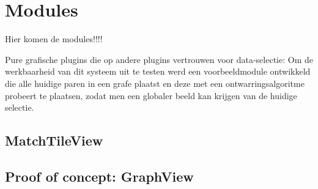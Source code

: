 \chapter{Modules}
\label{hoofdstuk:modules}

Hier komen de modules!!!!

Pure grafische plugins die op andere plugins vertrouwen voor data-selectie: Om de werkbaarheid van dit systeem uit te testen werd een voorbeeldmodule ontwikkeld die alle huidige paren in een grafe plaatst en deze met een ontwarringsalgoritme probeert te plaatsen, zodat men een globaler beeld kan krijgen van de huidige selectie.

\section{MatchTileView}

\section{Proof of concept: GraphView}